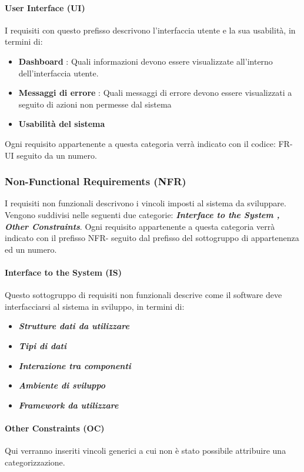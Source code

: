 \documentclass[a4paper,12pt]{article}
\begin{document}
    \paragraph{User Interface (UI)}

    I requisiti con questo prefisso descrivono l'interfaccia utente e la sua usabilità, in termini di:
    \begin{itemize}
        \item \textbf{Dashboard} : Quali informazioni devono essere visualizzate all'interno dell'interfaccia utente.
        \item \textbf{Messaggi di errore} : Quali messaggi di errore devono essere visualizzati a seguito di azioni non permesse dal sistema
        \item \textbf{Usabilità del sistema}
    \end{itemize}
    Ogni requisito appartenente a questa categoria verrà indicato con il codice: FR-UI seguito da un numero.
    \subsubsection{Non-Functional Requirements (NFR)}
    I requisiti non funzionali descrivono i vincoli imposti al sistema da sviluppare. Vengono suddivisi nelle seguenti due categorie: \textbf{\textit{Interface to the System , Other Constraints}}.
    Ogni requisito appartenente a questa categoria verrà indicato con il prefisso NFR- seguito dal prefisso del sottogruppo di appartenenza ed un numero.
    \paragraph{Interface to the System (IS)}
    Questo sottogruppo di requisiti non funzionali descrive come il software deve interfacciarsi al sistema in sviluppo, in termini di:
    \begin{itemize}
        \item \textbf{\textit{Strutture dati da utilizzare}}
        \item \textbf{\textit{Tipi di dati}}
        \item \textbf{\textit{Interazione tra componenti }}
        \item \textbf{\textit{Ambiente di sviluppo}}
        \item \textbf{\textit{Framework da utilizzare}}
    \end{itemize}
    \paragraph{Other Constraints (OC)}
    Qui verranno inseriti vincoli generici a cui non è stato possibile attribuire una categorizzazione.
\end{document}
